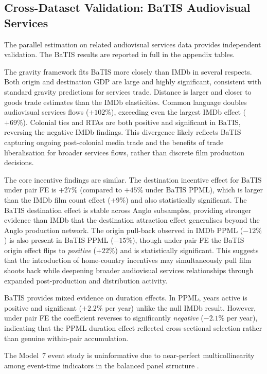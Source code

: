 \subsection{Cross-Dataset Validation: BaTIS Audiovisual Services}
\label{sec:batis_results}

The parallel estimation on related audiovisual services data provides independent validation. The BaTIS results are reported in full in the appendix tables.

The gravity framework fits BaTIS more closely than IMDb in several respects. Both origin and destination GDP are large and highly significant, consistent with standard gravity predictions for services trade. Distance is larger and closer to goods trade estimates than the IMDb elasticities. Common language doubles audiovisual services flows ($+102\%$), exceeding even the largest IMDb effect ($+69\%$). Colonial ties and RTAs are both positive and significant in BaTIS, reversing the negative IMDb findings. This divergence likely reflects BaTIS capturing ongoing post-colonial media trade and the benefits of trade liberalisation for broader services flows, rather than discrete film production decisions.

The core incentive findings are similar. The destination incentive effect for BaTIS under pair FE is $+27\%$ (compared to $+45\%$ under BaTIS PPML), which is larger than the IMDb film count effect ($+9\%$) and also statistically significant. The BaTIS destination effect is stable across Anglo subsamples, providing stronger evidence than IMDb that the destination attraction effect generalises beyond the Anglo production network. The origin pull-back observed in IMDb PPML ($-12\%$) is also present in BaTIS PPML ($-15\%$), though under pair FE the BaTIS origin effect flips to \textit{positive} ($+22\%$) and is statistically significant. This suggests that the introduction of home-country incentives may simultaneously pull film shoots back while deepening broader audiovisual services relationships through expanded post-production and distribution activity.

BaTIS provides mixed evidence on duration effects. In PPML, years active is positive and significant ($+2.2\%$ per year) unlike the null IMDb result. However, under pair FE the coefficient reverses to significantly \textit{negative} ($-2.1\%$ per year), indicating that the PPML duration effect reflected cross-sectional selection rather than genuine within-pair accumulation.

The Model~7 event study is uninformative due to near-perfect multicollinearity among event-time indicators in the balanced panel structure \citep{borusyak2024}.